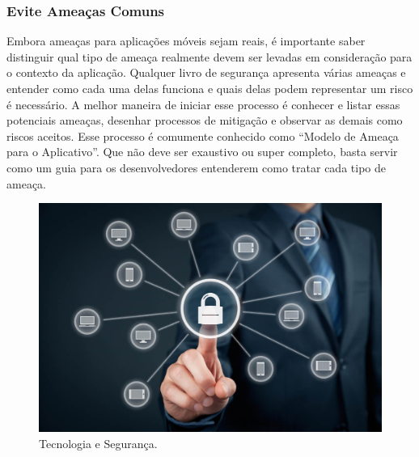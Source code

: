 \subsubsection{Evite Ameaças Comuns}
Embora ameaças para aplicações móveis sejam reais, é importante saber distinguir qual tipo de ameaça realmente devem ser levadas em consideração para o contexto da aplicação. Qualquer livro de segurança apresenta várias ameaças e entender como cada uma delas funciona e quais delas podem representar um risco é necessário. A melhor maneira de iniciar esse processo é conhecer e listar essas potenciais ameaças, desenhar processos de mitigação e observar as demais como riscos aceitos. Esse processo é comumente conhecido como “Modelo de Ameaça para o Aplicativo”. Que não deve ser exaustivo ou super completo, basta servir como um guia para os desenvolvedores entenderem como tratar cada tipo de ameaça. \cite{DWIVEDI}

\begin{figure}[h]
\centering
\includegraphics[width=.5\textwidth]{secoes/figuras/img1.jpg}
\caption{Tecnologia e Segurança.}
\label{figura1}
\end{figure}